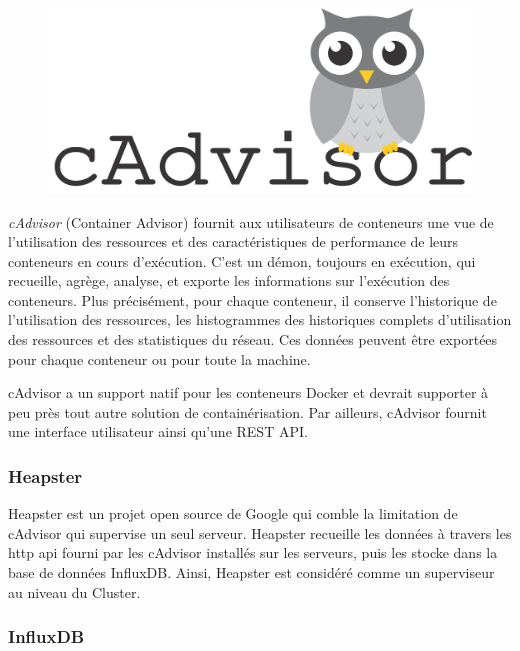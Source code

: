 \begin{onehalfspace}
\begin{figure}
\centering
\includegraphics[scale=0.2]{chapitre5/assets/cadvisor}
\end{figure}
\noindent \emph{cAdvisor} (Container Advisor) fournit aux utilisateurs de conteneurs une vue de l'utilisation des ressources et des caractéristiques de performance de leurs conteneurs en cours d'exécution. C'est un démon, toujours en exécution, qui recueille, agrège, analyse, et exporte les informations sur l'exécution des conteneurs. Plus précisément, pour chaque conteneur, il conserve l'historique de l'utilisation des ressources, les histogrammes des historiques complets d'utilisation des ressources et des statistiques du réseau. Ces données peuvent être exportées pour chaque conteneur ou pour toute la machine.

cAdvisor a un support natif pour les conteneurs Docker et devrait supporter à peu près tout autre solution de containérisation. Par ailleurs, cAdvisor fournit une interface utilisateur ainsi qu'une REST API.


\subsubsection*{Heapster}

Heapster est un projet open source de Google qui comble la limitation de cAdvisor qui supervise un seul serveur. Heapster recueille les données à travers les \acrshort{http} \acrshort{api} fourni par les cAdvisor installés sur les serveurs, puis les stocke dans la base de données InfluxDB. Ainsi, Heapster est considéré comme un superviseur au niveau du Cluster.

\subsubsection*{InfluxDB}


\end{onehalfspace}
